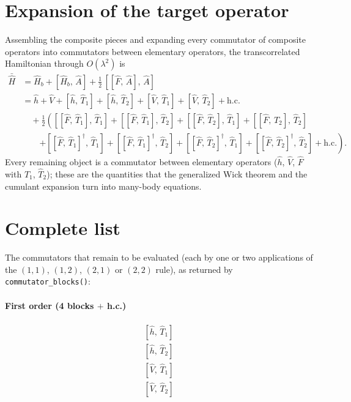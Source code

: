 \documentclass[11pt]{article}
\newcommand{\hc}{+\mathrm{h.c.}}
\begin{document}
\section{Expansion of the target operator}
Assembling the composite pieces and expanding every commutator of composite operators into commutators between elementary operators, the transcorrelated Hamiltonian through $O(\lambda^2)$ is
\begin{align}
\bar{\hat{H}} &= \hat{H}_{b} + \left[\hat{H}_{b},\, \hat{A}\right] + \frac{1}{2}\, \left[\left[\hat{F},\, \hat{A}\right],\, \hat{A}\right] \\
&= \hat{h} + \hat{V} + \left[\hat{h},\, \hat{T}_{1}\right] + \left[\hat{h},\, \hat{T}_{2}\right] + \left[\hat{V},\, \hat{T}_{1}\right] + \left[\hat{V},\, \hat{T}_{2}\right] \hc \nonumber \\
&\quad + \tfrac{1}{2}\left(\left[\left[\hat{F},\, \hat{T}_{1}\right],\, \hat{T}_{1}\right] + \left[\left[\hat{F},\, \hat{T}_{1}\right],\, \hat{T}_{2}\right] + \left[\left[\hat{F},\, \hat{T}_{2}\right],\, \hat{T}_{1}\right] + \left[\left[\hat{F},\, \hat{T}_{2}\right],\, \hat{T}_{2}\right] \right. \nonumber \\
&\qquad \left. + \left[\left[\hat{F},\, \hat{T}_{1}\right]^{\dagger},\, \hat{T}_{1}\right] + \left[\left[\hat{F},\, \hat{T}_{1}\right]^{\dagger},\, \hat{T}_{2}\right] + \left[\left[\hat{F},\, \hat{T}_{2}\right]^{\dagger},\, \hat{T}_{1}\right] + \left[\left[\hat{F},\, \hat{T}_{2}\right]^{\dagger},\, \hat{T}_{2}\right] \hc \right). \nonumber
\end{align}
Every remaining object is a commutator between elementary operators ($\hat{h}$, $\hat{V}$, $\hat{F}$ with $\hat{T}_1$, $\hat{T}_2$); these are the quantities that the generalized Wick theorem and the cumulant expansion turn into many-body equations.

\section{Complete list}
The commutators that remain to be evaluated (each by one or two applications of the $(1,1)$, $(1,2)$, $(2,1)$ or $(2,2)$ rule), as returned by \texttt{commutator\_blocks()}:
\paragraph{First order (4 blocks $+$ h.c.)}
\begin{align}
\left[\hat{h},\, \hat{T}_{1}\right] \\
\left[\hat{h},\, \hat{T}_{2}\right] \\
\left[\hat{V},\, \hat{T}_{1}\right] \\
\left[\hat{V},\, \hat{T}_{2}\right]
\end{align}
\end{document}

